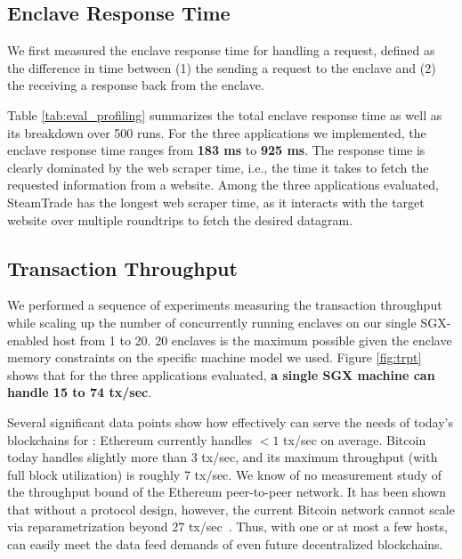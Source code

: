 \vspace{-2mm}
\subsection{Enclave Response Time}
\label{subsec:response time}
We first measured the enclave response time for handling a \tc request, defined as the difference in time between (1)  
the \medname sending a request to the enclave 
and (2) the \medname receiving a response back from the enclave. 

Table \ref{tab:eval_profiling} summarizes the total enclave response time as
well as its breakdown over 500 runs.  For the three applications we
implemented, the enclave response time ranges from {\bf 183 ms} to {\bf 925 ms}.
The response time is clearly dominated by the web scraper time, i.e., the time
it takes to fetch the requested information from a website.  Among the three
applications evaluated, {\sf SteamTrade} has the longest web scraper time, as it interacts with the target website
over multiple roundtrips to fetch the desired datagram.


\subsection{Transaction Throughput}
We performed a sequence of experiments measuring the transaction throughput while scaling up the number of concurrently running enclaves 
on our single SGX-enabled host from 1 to 20. 20 \tc enclaves is the maximum possible given the enclave memory constraints on the specific machine model we used.
Figure \ref{fig:trpt}
shows that for the three applications evaluated,
{\bf a single SGX machine can handle
15 to 74
tx/sec}. 

Several significant data points show
how effectively \tc can serve the needs of 
today's blockchains for \tc: 
Ethereum currently handles 
$< 1$ tx/sec on average. 
Bitcoin today handles slightly more than
3 tx/sec, and 
its maximum throughput (with full block utilization)
is roughly 7 tx/sec.
We know of no measurement study of the
throughput bound of the Ethereum  peer-to-peer network.
It has been shown that without
a protocol design, however, the current 
Bitcoin network cannot scale via reparametrization beyond  
27 tx/sec~\cite{blockchainscaling}.
Thus, with one or at most a few hosts, \tc can easily meet the data feed demands of  
even future decentralized blockchains.

